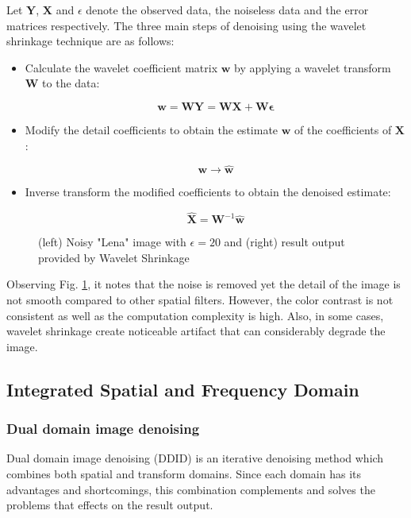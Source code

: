 Let $\mathbf{Y}$, $\mathbf{X}$ and $\epsilon$ denote the observed data, the noiseless data and the error matrices respectively. The three main steps of denoising using the wavelet shrinkage technique are as follows:

\begin{itemize}
	\item Calculate the wavelet coefficient matrix $\mathbf{w}$ by applying a wavelet transform $\mathbf{W}$ to the data:

	\begin{equation}
	    \mathbf{w} = \mathbf{WY} = \mathbf{WX} + \mathbf{W\epsilon}
	\end{equation}
	
	\item Modify the detail coefficients to obtain the estimate $\mathbf{w}$ of the coefficients of $\mathbf{X}$:
	
	\begin{equation}
	    \mathbf{w} \rightarrow \hat{\mathbf{w}}
	\end{equation}
	
	\item Inverse transform the modified coefficients to obtain the denoised estimate:
	
	\begin{equation}
	    \hat{\mathbf{X}} = \mathbf{W}^{-1}\hat{\mathbf{w}}
	\end{equation}
\end{itemize}

\begin{figure}[ht]
	\caption{(left) Noisy "Lena" image with $\epsilon = 20$ and (right) result output provided by Wavelet Shrinkage \cite{fodor2003denoising}}
	\label{fig:wavelet_shrinkage}
\end{figure}

Observing Fig. \ref{fig:wavelet_shrinkage}, it notes that the noise is removed yet the detail of the image is not smooth compared to other spatial filters. However, the color contrast is not consistent as well as the computation complexity is high. Also, in some cases, wavelet shrinkage create noticeable artifact that can considerably degrade the image.

\subsection{Integrated Spatial and Frequency Domain}
\subsubsection{Dual domain image denoising}
Dual domain image denoising (DDID) \cite{Knaus2013} is an iterative denoising method which combines both spatial and transform domains. Since each domain has its advantages and shortcomings, this combination complements and solves the problems that effects on the result output.  

